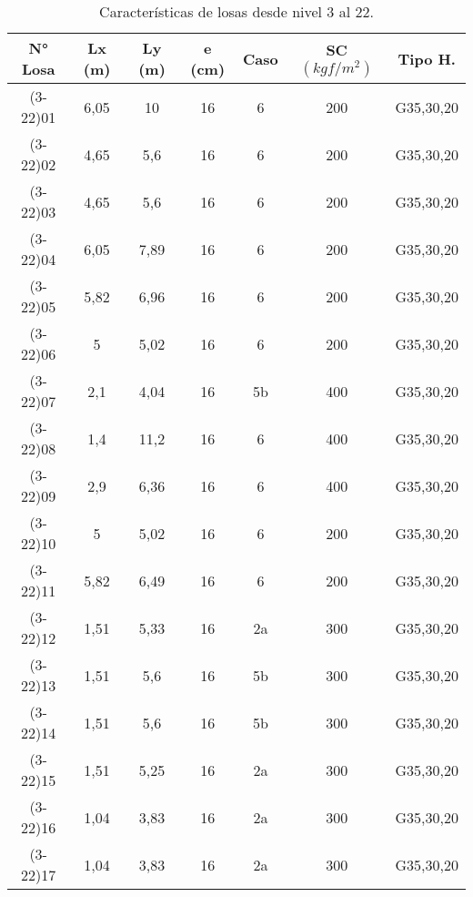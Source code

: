 \begin{table}[H]
  \centering
  \caption{Características de losas desde nivel 3 al 22.}
  \begin{tabular}{ccccccc}
    \hline
    \textbf{N° Losa} &      \textbf{Lx (m)} &      \textbf{Ly (m)} &      \textbf{e (cm)} &      \textbf{Caso} &      \textbf{SC $(kgf/m^2)$} &      \textbf{Tipo H.}      \bigstrut\\
    \hline
    (3-22)01 &      6,05 &      10 &      16 &      6 &      200 &      G35,30,20      \bigstrut[t]\\
    (3-22)02 &      4,65 &      5,6 &      16 &      6 &      200 &      G35,30,20      \\
    (3-22)03 &      4,65 &      5,6 &      16 &      6 &      200 &      G35,30,20      \\
    (3-22)04 &      6,05 &      7,89 &      16 &      6 &      200 &      G35,30,20      \\
    (3-22)05 &      5,82 &      6,96 &      16 &      6 &      200 &      G35,30,20      \\
    (3-22)06 &      5 &      5,02 &      16 &      6 &      200 &      G35,30,20      \\
    (3-22)07 &      2,1 &      4,04 &      16 &      5b &      400 &      G35,30,20      \\
    (3-22)08 &      1,4 &      11,2 &      16 &      6 &      400 &      G35,30,20      \\
    (3-22)09 &      2,9 &      6,36 &      16 &      6 &      400 &      G35,30,20      \\
    (3-22)10 &      5 &      5,02 &      16 &      6 &      200 &      G35,30,20      \\
    (3-22)11 &      5,82 &      6,49 &      16 &      6 &      200 &      G35,30,20      \\
    (3-22)12 &      1,51 &      5,33 &      16 &      2a &      300 &      G35,30,20      \\
    (3-22)13 &      1,51 &      5,6 &      16 &      5b &      300 &      G35,30,20      \\
    (3-22)14 &      1,51 &      5,6 &      16 &      5b &      300 &      G35,30,20      \\
    (3-22)15 &      1,51 &      5,25 &      16 &      2a &      300 &      G35,30,20      \\
    (3-22)16 &      1,04 &      3,83 &      16 &      2a &      300 &      G35,30,20      \\
    (3-22)17 &      1,04 &      3,83 &      16 &      2a &      300 &      G35,30,20      \\

\end{tabular}
\end{table}
